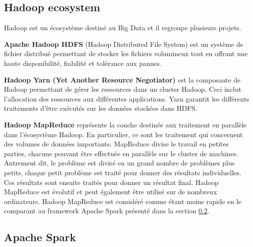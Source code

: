 \subsection{Hadoop ecosystem}

Hadoop est un écosystème destiné au Big Data et il regroupe plusieurs projets. \par 
\textbf{Apache Hadoop HDFS}  (Hadoop Distributed File System) est un système de fichier distribué permettant de stocker les fichiers volumineux tout en  offrant une haute disponibilité, fiabilité et tolérance aux pannes.\par
\textbf{Hadoop Yarn (Yet Another Resource Negotiator)} est la composante  de Hadoop permettant de  gérer les ressources dans un cluster Hadoop. Ceci inclut l'allocation des ressources aux différentes applications.  Yarn  garantit les différents traitements d'être exécutés sur les données stockées dans HDFS.\par

\textbf{Hadoop MapReduce}  représente la couche destinée aux traitement en parallèle  dans l'écosystème Hadoop. En particulier, ce sont les traitement qui concernent des volumes de données importants.
MapReduce divise le travail en petites parties, chacune pouvant être effectuée en parallèle sur le cluster de machines. Autrement dit, le  problème est divisé en un grand nombre de problèmes plus petits, chaque petit problème est traité pour donner des résultats individuelles. Ces résultats sont ensuite traités pour donner un résultat final. Hadoop MapReduce est évolutif et peut également être utilisé sur de nombreux ordinateurs. Hadoop MapReduce est considéré comme étant moins rapide en le comparant au framework Apache Spark présenté dans la section \ref{apache-spark}.









\subsection{Apache Spark } \label{apache-spark}

